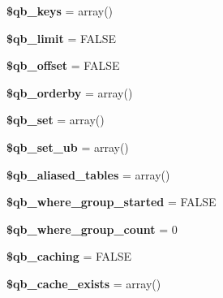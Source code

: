 \begin{DoxyCompactItemize}
{\bfseries \$qb\+\_\+keys} = array()
\item 
\mbox{\label{class_c_i___d_b__query__builder_a308dcfd76eb933f54456cb55e7e46c41}} 
{\bfseries \$qb\+\_\+limit} = F\+A\+L\+SE
\item 
\mbox{\label{class_c_i___d_b__query__builder_acc1e04e14b094ef24a8deec263b08ce9}} 
{\bfseries \$qb\+\_\+offset} = F\+A\+L\+SE
\item 
\mbox{\label{class_c_i___d_b__query__builder_a2e55f4c2dfc292e450c72afa2b4b4381}} 
{\bfseries \$qb\+\_\+orderby} = array()
\item 
\mbox{\label{class_c_i___d_b__query__builder_a8d5ac7a55567db02aeed544e0fe4d821}} 
{\bfseries \$qb\+\_\+set} = array()
\item 
\mbox{\label{class_c_i___d_b__query__builder_aaa8d3ba9f87b862df0e18cc8a02461a5}} 
{\bfseries \$qb\+\_\+set\+\_\+ub} = array()
\item 
\mbox{\label{class_c_i___d_b__query__builder_ab7c60460fc83e2532bb20d6f12b7cada}} 
{\bfseries \$qb\+\_\+aliased\+\_\+tables} = array()
\item 
\mbox{\label{class_c_i___d_b__query__builder_a73ce4389ccb0a8259851ffb940b9ec0a}} 
{\bfseries \$qb\+\_\+where\+\_\+group\+\_\+started} = F\+A\+L\+SE
\item 
\mbox{\label{class_c_i___d_b__query__builder_a5d2d71778686641580cd37ff17d0e2c8}} 
{\bfseries \$qb\+\_\+where\+\_\+group\+\_\+count} = 0
\item 
\mbox{\label{class_c_i___d_b__query__builder_ac9173a132044be359fbce9040031ab01}} 
{\bfseries \$qb\+\_\+caching} = F\+A\+L\+SE
\item 
\mbox{\label{class_c_i___d_b__query__builder_aabcbe10104e9ac809576528a381991f7}} 
{\bfseries \$qb\+\_\+cache\+\_\+exists} = array()
\item 

\end{DoxyCompactItemize}
